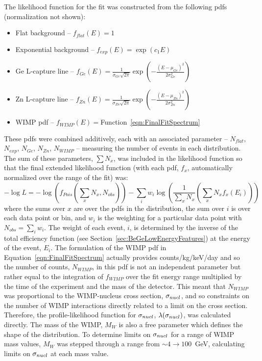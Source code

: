 The likelihood function for the fit was constructed from the following pdfs (normalization not shown):	
		\begin{itemize}
			\item Flat background --  $f_{flat}(E) = 1$
			\item Exponential background --  $f_{exp}(E) = \exp\left(c_{1} E\right)$				
			\item Ge L-capture line -- $f_{Ge}(E) = \frac{1}{\sigma_{Ge}\sqrt{2 \pi}} 
								\exp\left(-\frac{(E - \mu_{Ge})^{2}}{2 \sigma_{Ge}^{2}}\right)$
			\item Zn L-capture line -- $f_{Zn}(E) = \frac{1}{\sigma_{Zn}\sqrt{2 \pi}} 
								\exp\left(-\frac{(E - \mu_{Zn})^{2}}{2 \sigma_{Zn}^{2}}\right)$				
								
			\item WIMP pdf -- $f_{WIMP}(E) = $Function~\ref{eqn:FinalFitSpectrum}				
		\end{itemize}			
These pdfs were combined additively, each with an associated parameter -- $N_{flat}$, $N_{exp}$, $N_{Ge}$, $N_{Zn}$, $N_{WIMP}$  -- measuring the number of events in each distribution.  The sum of these parameters, $\sum N_{x}$, was included in the likelihood function so that the final extended likelihood function (with each pdf, $f_{x}$, automatically normalized over the range of the fit) was:
		\begin{equation}
			- \log L = -\log \left( f_{Pois} \left( \sum_{x} N_{x}, N_{obs} \right) \right) 
					- \sum_{i} w_{i} \log \left( 
						\frac{1}{\sum_{x} N_{x}} 
							\left( \sum_{x} N_{x} f_{x} (E_{i})
							\right) 
						\right)
		\end{equation}
where the sums over $x$ are over the pdfs in the distribution, the sum over $i$ is over each data point or bin, and $w_{i}$ is the weighting for a particular data point with $N_{obs} = \sum_{i} w_{i}$.  The weight of each event, $i$, is determined by the inverse of the total efficiency function (see Section~\ref{sec:BeGeLowEnergyFeatures}) at the energy of the event, $E_{i}$.  The formulation of the WIMP pdf in Equation~\ref{eqn:FinalFitSpectrum} actually provides counts/kg/keV/day and so the number of counts, $N_{WIMP}$, in this pdf is not an independent parameter but rather equal to the integration of $f_{WIMP}$ over the fit energy range multiplied by the time of the experiment and the mass of the detector.  This meant that $N_{WIMP}$ was proportional to the WIMP-nucleus cross section, $\sigma_{nucl}$, and so constraints on the number of WIMP interactions directly related to a limit on the cross section.  Therefore, the profile-likelihood function for $\sigma_{nucl}$, $\lambda(\sigma_{nucl})$, was calculated directly.  The mass of the WIMP, $M_{W}$ is also a free parameter which defines the shape of the distribution.  To determine limits on $\sigma_{nucl}$ for a range of WIMP mass values, $M_{W}$ was stepped through a range from $\sim4\to100$~GeV, calculating limits on $\sigma_{nucl}$ at each mass value.  

